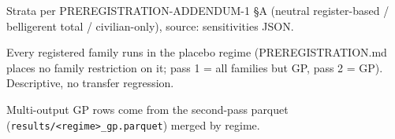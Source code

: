 \begin{threeparttable}
\begin{tablenotes}
\item Strata per PREREGISTRATION-ADDENDUM-1 \S A (neutral register-based / belligerent total / civilian-only), source: sensitivities JSON.
\item Every registered family runs in the placebo regime (PREREGISTRATION.md places no family restriction on it; pass 1 = all families but GP, pass 2 = GP). Descriptive, no transfer regression.
\item Multi-output GP rows come from the second-pass parquet (\texttt{results/<regime>\_gp.parquet}) merged by regime.
\end{tablenotes}
\end{threeparttable}

